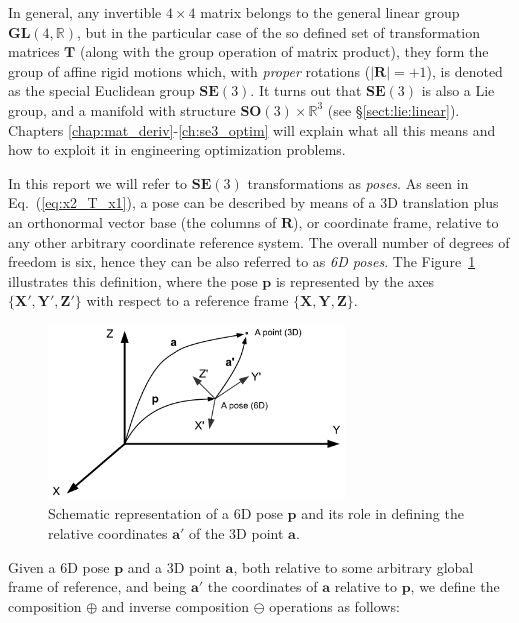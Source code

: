 \documentclass[a4paper,11pt]{report}
\begin{document}
In general, any invertible $4 \times 4$ matrix belongs to the
general linear group $\mathbf{GL}(4,\mathbb{R})$, but in the particular case of
the so defined set of transformation matrices $\mathbf{T}$
(along with the group operation of matrix product),
they form the group of affine rigid motions which, with \emph{proper} rotations
($|\mathbf{R}|=+1$), is denoted as the special Euclidean group $\mathbf{SE}(3)$.
It turns out that $\mathbf{SE}(3)$ is also a Lie group, and
a manifold with structure $\mathbf{SO}(3) \times \mathbb{R}^3$ (see \S\ref{sect:lie:linear}).
Chapters \ref{chap:mat_deriv}-\ref{ch:se3_optim} will explain
what all this means and how to exploit it in engineering optimization problems.

In this report we will refer to $\mathbf{SE}(3)$ transformations as \emph{poses}.
As seen in Eq.~(\ref{eq:x2_T_x1}), a pose can be described by means of a 3D translation
plus an orthonormal vector base (the columns of $\mathbf{R}$),
or coordinate frame, relative to any other arbitrary coordinate reference system.
The overall number of degrees of freedom is six, hence they can be also referred
to as \emph{6D poses}.
The Figure~\ref{fig:1} illustrates this definition, where the pose $\mathbf{p}$ is represented
by the axes $\{\mathbf{X}',\mathbf{Y}',\mathbf{Z}' \}$ with respect to a reference frame
$\{\mathbf{X},\mathbf{Y},\mathbf{Z} \}$.


\begin{figure}[h!]
\centering
\includegraphics[width=0.70\textwidth]{imgs/fig_pose_composition.pdf}
\caption{Schematic representation of a 6D pose $\mathbf{p}$ and its role in defining
the relative coordinates $\mathbf{a}'$ of the 3D point $\mathbf{a}$.}
\label{fig:1}
\end{figure}


Given a 6D pose $\mathbf{p}$ and a 3D point $\mathbf{a}$, both relative to some arbitrary
global frame of reference, and being $\mathbf{a}'$ the coordinates of $\mathbf{a}$ relative
to $\mathbf{p}$, we define
the composition $\oplus$ and inverse composition $\ominus$ operations as follows:
\end{document}
